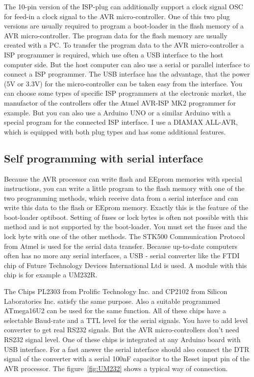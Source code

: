 The 10-pin version of the ISP-plug can additionally support a clock signal OSC
for feed-in a clock signal to the AVR micro-controller.
One of this two plug versions are usually required to program a boot-loader in
the flash memory of a AVR micro-controller. The program data
for the flash memory are usually created with a PC.
To transfer the program data to the AVR micro-controller a ISP programmer
is required, which use often a USB interface to the host computer side.
But the host computer can also use a serial or parallel interface to
connect a ISP programmer.
The USB interface has the advantage, that the power (5V or 3.3V) for
the micro-controller can be taken easy from the interface.
You can choose some types of specific ISP programmers at the electronic market,
the manufactor of the controllers offer the Atmel AVR-ISP MK2 programmer for example.
But you can also use a Arduino UNO or a similar Arduino with
a special program for the connected ISP interface.
I use a DIAMAX ALL-AVR, which is equipped with both plug types
and has some additional features.

\subsection{Self programming with serial interface}

Because the AVR processor can write flash and EEprom memories with special instructions,
you can write a little program to the flash memory with one of the two programming methods,
which receive data from a serial interface and can write this data to
the flash or EEprom memory.
Exactly this is the feature of the boot-loader optiboot.
Setting of fuses or lock bytes is often not possible with this method and
is not supported by the boot-loader.
You must set the fuses and the lock byte with one of the other methods.
The STK500 Communication Protocol from Atmel is used for the serial data transfer.
Because up-to-date computers often has no more any serial interfaces, 
a USB - serial converter like the FTDI chip of Future Technology Devices International Ltd
is used. A module with this chip is for example a UM232R.

The Chips PL2303 from Prolific Technology Inc. and CP2102 from Silicon Laboratories Inc. 
satisfy the same purpose.
Also a suitable programmed ATmega16U2 can be used for the same function.
All of these chips have a selectable Baud-rate and a TTL level for the serial signals.
You have to add level converter to get real RS232 signals.
But the AVR micro-controllers don't need RS232 signal level.
One of these chips is integrated at any Arduino board with USB interface.
For a fast answer the serial interface should also connect the DTR signal of
the converter with a serial 100nF capacitor to the Reset input pin of
the AVR processor. The figure~\ref{fig:UM232} shows a  typical way of connection.

